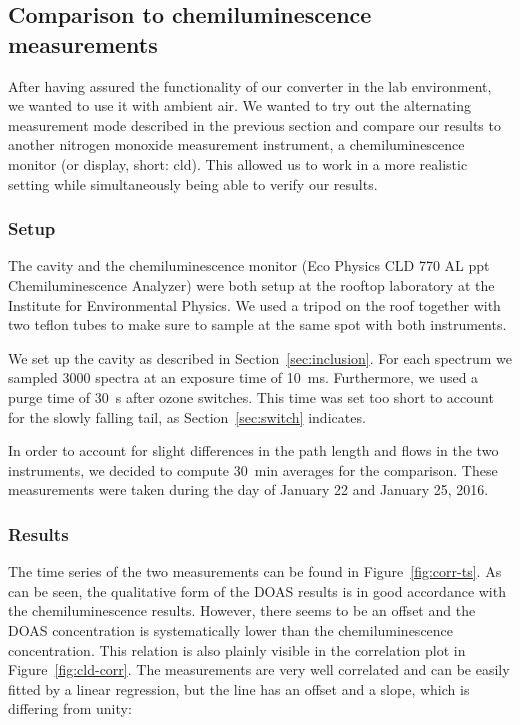 \subsection{Comparison to chemiluminescence measurements}
\label{sec:cld}

After having assured the functionality of our converter in the lab
environment, we wanted to use it with ambient air. We wanted to try
out the alternating measurement mode described in the previous section
and compare our results to another nitrogen monoxide measurement
instrument, a chemiluminescence monitor (or display, short: cld). This
allowed us to  work in a more realistic setting while
simultaneously being able to verify our results.

\subsubsection{Setup}
\label{sec:cld-setup}

The cavity and the chemiluminescence monitor (Eco Physics CLD 770 AL
ppt Chemiluminescence  Analyzer) were both setup at the rooftop
laboratory at the Institute for Environmental Physics. We used a
tripod on the roof together with two teflon tubes to make sure to
sample at the same spot with both instruments.

We set up the cavity as described in Section~\ref{sec:inclusion}. For
each spectrum we sampled 3000 spectra at an exposure time of
\SI{10}{\milli\second}. Furthermore, we used a purge time of
\SI{30}{\second} after ozone switches. This time was set too short to
account for the slowly falling tail, as Section~\ref{sec:switch}
indicates.

In order to account for slight differences in the path length and
flows in the two instruments, we decided to compute \SI{30}{\minute}
averages for the comparison. These measurements were taken during the
day of January 22 and January 25, 2016.

\subsubsection{Results}
\label{sec:cld-results}

The time series of the two measurements can be found in
Figure~\ref{fig:corr-ts}. As can be seen, the qualitative form of the
DOAS results is in good accordance with the chemiluminescence results.
However, there seems to be an offset and the DOAS concentration is
systematically lower than the chemiluminescence concentration. This
relation is also plainly visible in the correlation plot in
Figure~\ref{fig:cld-corr}. The measurements are very well correlated
and can be easily fitted by a linear regression, but the line has an
offset and a slope, which is differing from unity:

